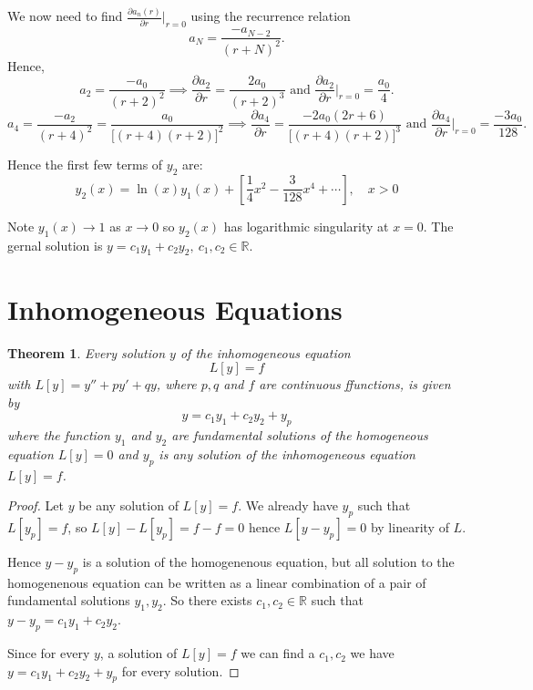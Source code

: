 \documentclass{article}
\theoremstyle{plain}
\newtheorem{thm}{Theorem}[section]
\theoremstyle{definition}
\numberwithin{equation}{section}
\begin{document}
    \begin{tcolorbox}
        We now need to find $ \frac{\partial a_n(r)}{\partial r}\Big \vert_{r=0}$ using the recurrence relation
        \[
            a_N = \frac{-a_{N-2}}{(r+N)^2}.
        \]
        Hence,
        \[ a_2=\frac{-a_0}{(r+2)^2} \implies \frac{\partial a_2}{\partial r} = \frac{2a_0}{(r+2)^3} \text{ and } \frac{\partial a_2}{\partial r} \Big \vert_{r=0} = \frac{a_0}{4}.
        \]
        \[
            a_4 = \frac{-a_2}{(r+4)^2} = \frac{a_0}{\big[ (r+4)(r+2)\big]^2} \implies \frac{\partial a_4}{\partial r} = \frac{-2a_0(2r+6)}{\big[(r+4)(r+2)\big]^3} \text{ and } \frac{\partial a_4}{\partial r} \Big \vert_{r=0} = \frac{-3a_0}{128}.
        \]

    
        Hence the first few terms of $y_2$ are:
        \[ y_2(x) = \ln(x)y_1(x) + \left[ \frac{1}{4}x^2 - \frac{3}{128}x^4 + \cdots \right], \quad x>0 \]

        Note $y_1(x)\to1$ as $x\to 0$ so $y_2(x)$ has logarithmic singularity at $x=0$. The gernal solution is $y=c_1y_1 + c_2y_2, \ c_1,c_2 \in \mathbb{R}$.
        

\end{tcolorbox}

\pagebreak

\section{Inhomogeneous Equations}

\begin{thm}
Every solution $y$ of the inhomogeneous equation
\[ L[y] = f \]
with $L[y] = y'' + py' + qy$, where $p,q$ and $f$ are continuous ffunctions, is given by
\[ y = c_1y_1 + c_2y_2 + y_p \]
where the function $y_1$ and $y_2$ are fundamental solutions of the homogeneous equation $L[y]=0$ and $y_p$ is any solution of the inhomogeneous equation $L[y] = f$. 
\end{thm}

\begin{proof}
    Let $y$ be any solution of $L[y]=f$. We already have $y_p$ such that $L[y_p] = f$, so $L[y]-L[y_p] = f-f = 0$ hence $L[y-y_p] = 0$ by linearity of $L$.

    Hence $y-y_p$ is a solution of the homogenenous equation, but all solution to the homogenenous equation can be written as a linear combination of a pair of fundamental solutions $y_1,y_2$. So there exists $c_1,c_2 \in \mathbb{R}$ such that $y-y_p=c_1y_1 + c_2y_2$.

    Since for every $y$, a solution of $L[y]=f$ we can find a $c_1,c_2$ we have $y=c_1y_1 + c_2y_2 + y_p$ for every solution.
\end{proof}
\end{document}

